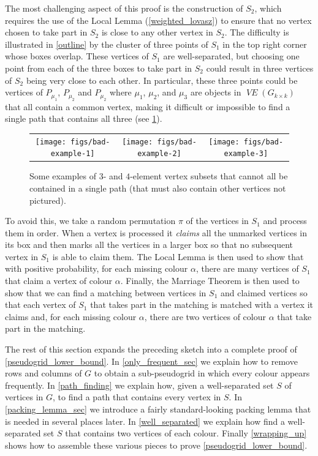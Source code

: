 \documentclass{patmorin}
\newcommand{\defin}[1]{\emph{\color{brightmaroon}#1}}
\DeclareMathOperator{\VE}{\mathit{VE}}
\begin{document}
The most challenging aspect of this proof is the construction of $S_2$, which requires the use of the Local Lemma (\cref{weighted_lovasz}) to ensure that no vertex chosen to take part in $S_2$ is close to any other vertex in $S_2$.  The difficulty is illustrated in \cref{outline} by the cluster of three points of $S_1$ in the top right corner whose boxes overlap.  These vertices of $S_1$ are well-separated, but choosing one point from each of the three boxes to take part in $S_2$ could result in three vertices of $S_2$ being very close to each other.  In particular, these three points could be vertices of $P_{\mu_1}$, $P_{\mu_2}$ and $P_{\mu_2}$ where $\mu_1$, $\mu_2$, and $\mu_3$ are objects in $\VE(G_{k\times k})$ that all contain a common vertex, making it difficult or impossible to find a single path that contains all three (see \cref{bad_examples}).

\begin{figure}
  \begin{center}
    \begin{tabular}{ccc}
      \texttt{[image: figs/bad-example-1]} &
      \texttt{[image: figs/bad-example-2]} &
      \texttt{[image: figs/bad-example-3]}
    \end{tabular}
  \end{center}
  \caption{Some examples of $3$- and $4$-element vertex subsets that cannot all be contained in a single path (that must also contain other vertices not pictured).}
  \label{bad_examples}
\end{figure}

To avoid this, we take a random permutation $\pi$ of the vertices in $S_1$ and process them in order.  When a vertex is processed it \defin{claims} all the unmarked vertices in its box and then marks all the vertices in a larger box so that no subsequent vertex in $S_1$ is able to claim them.  The Local Lemma is then used to show that with positive probability, for each missing colour $\alpha$, there are many vertices of $S_1$ that claim a vertex of colour $\alpha$.  Finally, the Marriage Theorem is then used to show that we can find a matching between vertices in $S_1$ and claimed vertices so that each vertex of $S_1$ that takes part in the matching is matched with a vertex it claims and, for each missing colour $\alpha$, there are two vertices of colour $\alpha$ that take part in the matching.

The rest of this section expands the preceding sketch into a complete proof of \cref{pseudogrid_lower_bound}. In \cref{only_frequent_sec} we explain how to remove rows and columns of $G$ to obtain a sub-pseudogrid in which every colour appears frequently.  In \cref{path_finding} we explain how, given a well-separated set $S$ of vertices in $G$, to find a path that contains every vertex in $S$.  In \cref{packing_lemma_sec} we introduce a fairly standard-looking packing lemma that is needed in several places later.  In \cref{well_separated} we explain how find a well-separated set $S$ that contains two vertices of each colour. Finally \cref{wrapping_up} shows how to assemble these various pieces to prove \cref{pseudogrid_lower_bound}.
\end{document}
